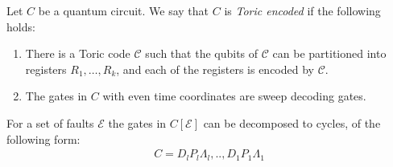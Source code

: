     \begin{definition}
      Let $C$ be a quantum circuit. We say that $C$ is \textit{Toric encoded} if the following holds:
      \begin{enumerate}
          \item There is a Toric code $\mathcal{C}$ such that the qubits of $\mathcal{C}$ can be partitioned into registers $R_{1}, \ldots, R_{k}$, and each of the registers is encoded by $\mathcal{C}$.   
          \item The gates in $C$ with even time coordinates are sweep decoding gates.
        \end{enumerate} 
        For a set of faults $\mathcal{E}$ the gates in $C[\mathcal{E}]$ can be decomposed to cycles, of the following form:
        \begin{equation*}
          \begin{split}
            C =     D_{l}P_{l}\Lambda_{l},..,D_{1} P_{1} \Lambda_{1}
          \end{split}
        \end{equation*}
    \end{definition}

